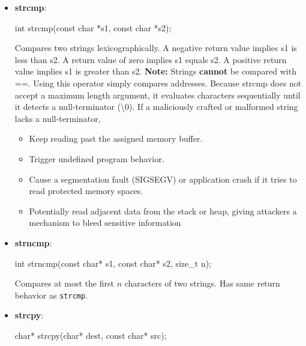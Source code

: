 \documentclass{report}
\begin{document}
\begin{itemize}
\begin{cppcode}
                sizeof s // 6, includes \0
                strlen(s) // 5, excludes \0
            \end{cppcode}
        \item \textbf{strcmp}: 
            \bigbreak \noindent 
            \begin{cppcode}
            int strcmp(const char *s1, const char *s2);
            \end{cppcode}
            \bigbreak \noindent 
            Compares two strings lexicographically.
            \bigbreak \noindent 
            A negative return value implies s1 is less than s2. A return value of zero implies s1 equals s2. A positive return value implies s1 is greater than s2.
            \bigbreak \noindent 
            \textbf{Note:} Strings \textbf{cannot} be compared with ==. Using this operator simply compares addresses.
            \bigbreak \noindent 
            Because strcmp does not accept a maximum length argument, it evaluates characters sequentially until it detects a null-terminator (\textbackslash 0). If a maliciously crafted or malformed string lacks a null-terminator,
            \begin{itemize}
                \item Keep reading past the assigned memory buffer.
                \item Trigger undefined program behavior.
                \item Cause a segmentation fault (SIGSEGV) or application crash if it tries to read protected memory spaces.
                \item Potentially read adjacent data from the stack or heap, giving attackers a mechanism to bleed sensitive information
            \end{itemize}
        \item \textbf{strncmp}: 
            \bigbreak \noindent 
            \begin{cppcode}
            int strncmp(const char* s1, const char* s2, size_t n);
            \end{cppcode}
            \bigbreak \noindent 
            Compares at most the first $n$ characters of two strings. 
            \bigbreak \noindent 
            Has same return behavior as \texttt{strcmp}.
        \item \textbf{strcpy}: 
            \bigbreak \noindent 
            \begin{cppcode}
            char* strcpy(char* dest, const char* src);
            \end{cppcode}

\end{itemize}
\end{document}
